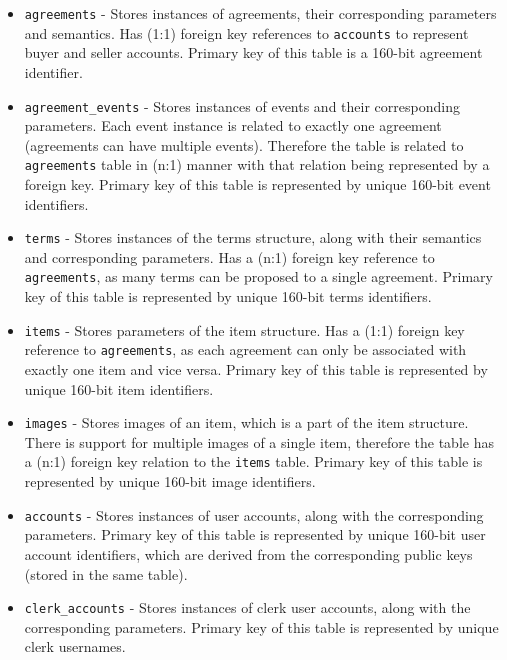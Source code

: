 \begin{itemize}
\item \texttt{agreements} - Stores instances of agreements, their corresponding parameters and semantics. Has (1:1) foreign key references to \texttt{accounts} to represent buyer and seller accounts. Primary key of this table is a 160-bit agreement identifier.

\item \texttt{agreement\_events} - Stores instances of events and their corresponding parameters. Each event instance is related to exactly one agreement (agreements can have multiple events). Therefore the table is related to \texttt{agreements} table in (n:1) manner with that relation being represented by a foreign key. Primary key of this table is represented by unique 160-bit event identifiers.

\item \texttt{terms} - Stores instances of the terms structure, along with their semantics and corresponding parameters. Has a (n:1) foreign key reference to \texttt{agreements}, as many terms can be proposed to a single agreement. Primary key of this table is represented by unique 160-bit terms identifiers.

\item \texttt{items} - Stores parameters of the item structure. Has a (1:1) foreign key reference to \texttt{agreements}, as each agreement can only be associated with exactly one item and vice versa. Primary key of this table is represented by unique 160-bit item identifiers.

\item \texttt{images} - Stores images of an item, which is a part of the item structure. There is support for multiple images of a single item, therefore the table has a (n:1) foreign key relation to the \texttt{items} table. Primary key of this table is represented by unique 160-bit image identifiers.

\item \texttt{accounts} - Stores instances of user accounts, along with the corresponding parameters. Primary key of this table is represented by unique 160-bit user account identifiers, which are derived from the corresponding public keys (stored in the same table).

\item \texttt{clerk\_accounts} - Stores instances of clerk user accounts, along with the corresponding parameters. Primary key of this table is represented by unique clerk usernames.


\end{itemize}
